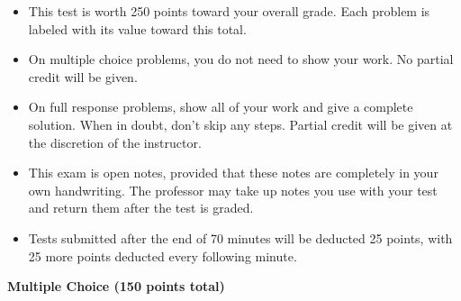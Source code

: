 \documentclass[12pt]{exam}
\newcommand{\<}{\langle}
\renewcommand{\>}{\rangle}
\begin{document}
\begin{center}
\end{center}
\vspace{0.1in}

\vspace{12pt}

\begin{itemize}
  \item This test is worth 250 points toward your overall grade.
        Each problem is labeled with its value toward this total.
  \item On multiple choice problems, you do not need to show your work. No
        partial credit will be given.
  \item On full response problems, show all of your work and give a
        complete solution. When in doubt, don't skip any steps. Partial
        credit will be given at the discretion of the instructor.
  \item This exam is open notes, provided that these notes are completely
        in your own handwriting. The professor may take up notes you use
        with your test and return them after the test is graded.
  \item Tests submitted after the end of 70 minutes will be deducted 25 points,
        with 25 more points deducted every following minute.
\end{itemize}

\newpage

\begin{center}
  \textbf{Multiple Choice (150 points total)}
\end{center}
\end{document}
